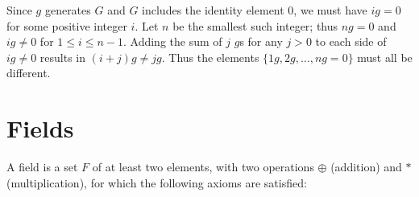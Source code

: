 \documentclass[11pt, letterpaper]{article}
\begin{document}
Since \( g \) generates \( G \) and \( G \) includes the identity element \( 0 \), we must have \( ig = 0 \) for some positive integer \( i \). Let \( n \) be the smallest such integer; thus \( ng = 0 \) and \( ig \neq 0 \) for \( 1 \leq i \leq n - 1 \). Adding the sum of \( j \) \( g \)s for any \( j > 0 \) to each side of \( ig \neq 0 \) results in \( (i + j)g \neq jg \). Thus the elements \(\{1g, 2g, \ldots, ng = 0\}\) must all be different.

\section{Fields}

A field is a set \( F \) of at least two elements, with two operations \( \oplus \) (addition) and \( \ast \) (multiplication), for which the following axioms are satisfied:
\end{document}
